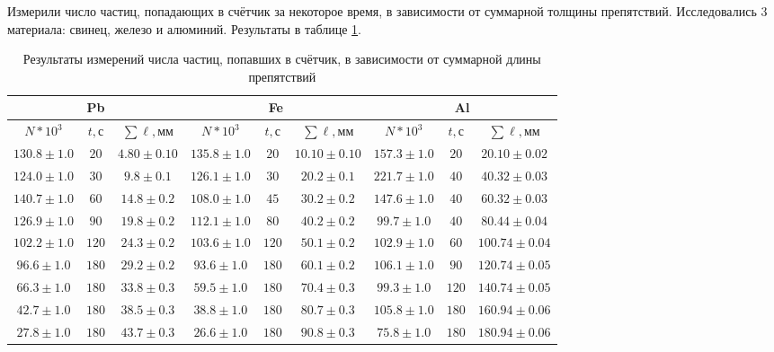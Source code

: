 \documentclass[a4paper, 12pt]{article}
\begin{document}
            Измерили число частиц, попадающих в счётчик за некоторое время, в зависимости от суммарной толщины препятствий. Исследовались 3 материала: свинец, железо и алюминий. Результаты в таблице \ref{tab:N}.

            \begin{table}[!ht]
                \centering
                \begin{tabular}{|c|c|c||c|c|c||c|c|c|}
                    \hline

                    \multicolumn{3}{|c||}{Pb} & \multicolumn{3}{c||}{Fe} & \multicolumn{3}{c|}{Al}\\ \hline
                    $N*10^3$ & $t, с$ & $\sum \ell, мм$ & $N*10^3$ & $t, с$ & $\sum \ell, мм$ & $N*10^3$ & $t, с$ & $\sum \ell, мм$\\ \hline
                    $130.8 \pm 1.0$ & $20$ & $4.80 \pm 0.10$ & $135.8 \pm 1.0$ & $20$ & $10.10 \pm 0.10$ & $157.3 \pm 1.0$ & $20$ & $20.10 \pm 0.02$\\ \hline
                    $124.0 \pm 1.0$ & $30$ & $9.8 \pm 0.1$ & $126.1 \pm 1.0$ & $30$ & $20.2 \pm 0.1$ & $221.7 \pm 1.0$ & $40$ & $40.32 \pm 0.03$\\ \hline
                    $140.7 \pm 1.0$ & $60$ & $14.8 \pm 0.2$ & $108.0 \pm 1.0$ & $45$ & $30.2 \pm 0.2$ & $147.6 \pm 1.0$ & $40$ & $60.32 \pm 0.03$\\ \hline
                    $126.9 \pm 1.0$ & $90$ & $19.8 \pm 0.2$ & $112.1 \pm 1.0$ & $80$ & $40.2 \pm 0.2$ & $99.7 \pm 1.0$ & $40$ & $80.44 \pm 0.04$\\ \hline
                    $102.2 \pm 1.0$ & $120$ & $24.3 \pm 0.2$ & $103.6 \pm 1.0$ & $120$ & $50.1 \pm 0.2$ & $102.9 \pm 1.0$ & $60$ & $100.74 \pm 0.04$\\ \hline
                    $96.6 \pm 1.0$ & $180$ & $29.2 \pm 0.2$ & $93.6 \pm 1.0$ & $180$ & $60.1 \pm 0.2$ & $106.1 \pm 1.0$ & $90$ & $120.74 \pm 0.05$\\ \hline
                    $66.3 \pm 1.0$ & $180$ & $33.8 \pm 0.3$ & $59.5 \pm 1.0$ & $180$ & $70.4 \pm 0.3$ & $99.3 \pm 1.0$ & $120$ & $140.74 \pm 0.05$\\ \hline
                    $42.7 \pm 1.0$ & $180$ & $38.5 \pm 0.3$ & $38.8 \pm 1.0$ & $180$ & $80.7 \pm 0.3$ & $105.8 \pm 1.0$ & $180$ & $160.94 \pm 0.06$\\ \hline
                    $27.8 \pm 1.0$ & $180$ & $43.7 \pm 0.3$ & $26.6 \pm 1.0$ & $180$ & $90.8 \pm 0.3$ & $75.8 \pm 1.0$ & $180$ & $180.94 \pm 0.06$\\ \hline

                \end{tabular}
                \caption{Результаты измерений числа частиц, попавших в счётчик, в зависимости от суммарной длины препятствий}
                \label{tab:N}
            \end{table}
\end{document}
